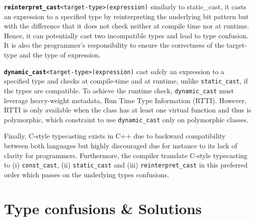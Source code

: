 \documentclass[a4paper,11pt,oneside]{report}
\begin{document}
\texttt{\textbf{reinterpret\_cast}<target-type>(expression)} similarly to static\_cast, it casts an expression to a specified type by reinterpreting the underlying bit pattern but with the difference 
that it does not check neither at compile time nor at runtime. Hence, it can potentially cast two incompatible types and lead to type confusion. 
It is also the programmer's responsibility to ensure the correctness of the target-type and the type of expression.

\texttt{\textbf{dynamic\_cast}<target-type>(expression)} cast safely an expression to a specified type and checks at compile-time and at runtime, unlike \texttt{static\_cast}, if the types are compatible. 
To achieve the runtime check, \texttt{dynamic\_cast} must leverage heavy-weight metadata, Run Time Type Information (RTTI). However, RTTI is only available when the class has at least one virtual function 
and thus is polymorphic, which constraint to use \texttt{dynamic\_cast} only on polymorphic classes.

Finally, C-style typecasting exists in C++ due to backward compatibility between both languages but highly discouraged due for instance to its lack of clarity for programmers. 
Furthermore, the compiler translate C-style typecasting to (i) \texttt{const\_cast}, (ii) \texttt{static\_cast} and (iii) \texttt{reinterpret\_cast} in this preferred order which passes on the underlying types confusions.

\section{Type confusions & Solutions} \label{sec:cpp_solutions}
\end{document}
